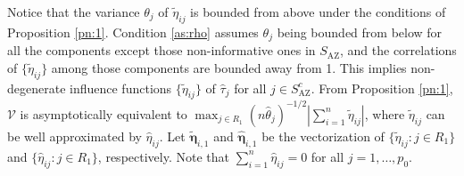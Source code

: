 \documentclass[12pt]{article}
\def\AZ{{ \mathrm{\scriptscriptstyle AZ} }}
\theoremstyle{definition}
\newcommand{\Cor}{\rm Corr}
\newcommand{\bG}{{\mathbf G}}
\newcommand{\bS}{{\mathbf S}}
\newcommand{\bU}{{\mathbf U}}
\newcommand{\bz}{{\mathbf z}}
\newcommand{\bfeta}  {\boldsymbol{\eta}}
\begin{document}
Notice that the variance $\theta_j$ of $\tilde{\eta}_{ij}$ is bounded from above under the conditions of Proposition \ref{pn:1}.
Condition \ref{as:rho} assumes $\theta_{j}$ being bounded from below for all the components except those non-informative ones in $S_{\AZ}$, and the correlations of $\{\tilde{\eta}_{ij}\}$ among those components are bounded away from 1. This implies non-degenerate influence functions $\{\tilde{\eta}_{ij}\}$ of $\hat{\tau}_j$ for all $j \in S_{\AZ}^{c}$.
%
From Proposition \ref{pn:1}, $\mathcal{V}$ is asymptotically equivalent to $\max_{j \in R_1} (n\hat{\theta}_{j})^{-1/2} |\sum_{i = 1}^{n} \tilde{\eta}_{ij}|$, where 
$\tilde{\eta}_{ij}$ can be well approximated by $\hat{\eta}_{ij}$. 
Let $\tilde{\bfeta}_{i, 1}$ and $\hat{\bfeta}_{i, 1}$ be the vectorization of $\{\tilde{\eta}_{ij} : j \in R_1\}$ and $\{\hat{\eta}_{ij} : j \in R_1\}$, respectively. 
Note that $\sum_{i =1}^{n}\hat{\eta}_{ij} = 0$ for all $j = 1, \ldots, p_0$.
\end{document}
